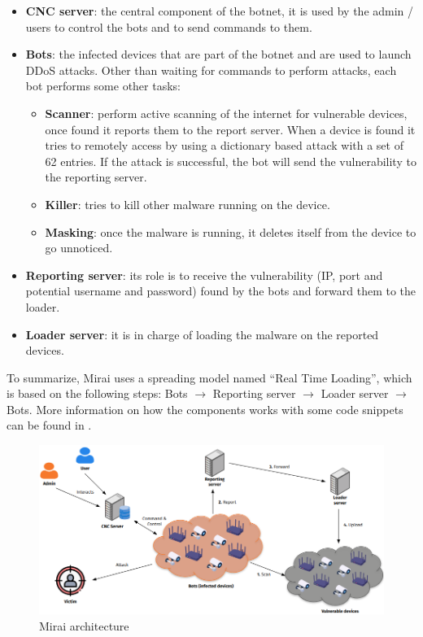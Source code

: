 \begin{itemize}
    \item \textbf{CNC server}: the central component of the botnet, it is used by the admin / users to control the bots and to send commands to them.
    \item \textbf{Bots}: the infected devices that are part of the botnet and are used to launch DDoS attacks. Other than waiting for commands to perform attacks, each bot performs some other tasks:
    \begin{itemize}
        \item \textbf{Scanner}: perform active scanning of the internet for vulnerable devices, once found it reports them to the report server. When a device is found it tries to remotely access by using a dictionary based attack with a set of 62 entries. If the attack is successful, the bot will send the vulnerability to the reporting server.
        \item \textbf{Killer}: tries to kill other malware running on the device.
        \item \textbf{Masking}: once the malware is running, it deletes itself from the device to go unnoticed.
    \end{itemize}
    \item \textbf{Reporting server}: its role is to receive the vulnerability (IP, port and potential username and password) found by the bots and forward them to the loader. 
    \item \textbf{Loader server}: it is in charge of loading the malware on the reported devices. 
\end{itemize}

To summarize, Mirai uses a spreading model named ``Real Time Loading'', which is based on the following steps: Bots $\rightarrow$ Reporting server $\rightarrow$ Loader server $\rightarrow$ Bots. \cite{de2018ddos} More information on how the components works with some code snippets can be found in .


\begin{figure}[ht]
    \centering
    \includegraphics[scale=0.5]{resources/images/mirai-architecture.png}
    \caption{Mirai architecture}
    \label{fig:mirai-architecture}
\end{figure}

